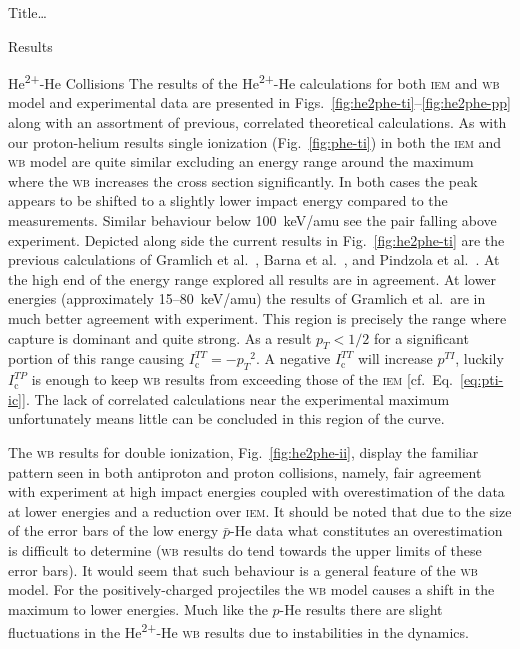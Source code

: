 \documentclass[letterpaper, 10 pt]{report}
\begin{document}
\begin{chapter}{ Title\dots \label{chap:p-he2p-he}}
\begin{section}{Results \label{sec:phe2p-res}}
\begin{subsection}{\texorpdfstring{He\textsuperscript{2+}}{He2+}-He Collisions 
                         \label{sec:he2phe-res}}
         The results of the He\textsuperscript{2+}-He calculations for both \textsc{iem} and \textsc{wb}
         model and experimental data are presented in Figs.~\ref{fig:he2phe-ti}--\ref{fig:he2phe-pp}
         along with an assortment of previous, correlated theoretical calculations. As with our
         proton-helium results single ionization (Fig.~\ref{fig:phe-ti}) in both the \textsc{iem} and
         \textsc{wb} model are quite similar excluding an energy range around the maximum where the
         \textsc{wb} increases the cross section significantly. In both cases the peak appears to be
         shifted to a slightly lower impact energy compared to the measurements. Similar behaviour below
         100~keV/amu see the pair falling above experiment. Depicted along side the current results in
         Fig.~\ref{fig:he2phe-ti} are the previous calculations of Gramlich et al.~\cite{GGS-89}, Barna
         et al.~\cite{BTB-05}, and Pindzola et al.~\cite{PRC-07}. At the high end of the energy range
         explored all results are in agreement. At lower energies (approximately 15--80~keV/amu) the
         results of Gramlich et al.\ are in much better agreement with experiment. This region is
         precisely the range where capture is dominant and quite strong. As a result $p_T < 1/2$ for a
         significant portion of this range causing $I^{TT}_\mathrm{c} = -{p_T}^2$. A negative
         $I^{TT}_\mathrm{c}$ will increase $p^{TI}$, luckily $I^{TP}_\mathrm{c}$ is enough to keep
         \textsc{wb} results from exceeding those of the \textsc{iem}  [cf.\ Eq.~\eqref{eq:pti-ic}]. The
         lack of correlated calculations near the experimental maximum unfortunately means little can be
         concluded in this region of the curve.

         The \textsc{wb} results for double ionization, Fig.~\ref{fig:he2phe-ii}, display the familiar
         pattern seen in both antiproton and proton collisions, namely, fair agreement with experiment
         at high impact energies coupled with overestimation of the data at lower energies and a
         reduction over \textsc{iem}. It should be noted that due to the size of the error bars of the
         low energy $\bar{p}$-He data what constitutes an overestimation is difficult to determine
         (\textsc{wb} results do tend towards the upper limits of these error bars). It would seem that
         such behaviour is a general feature of the \textsc{wb} model. For the positively-charged
         projectiles the \textsc{wb} model causes a shift in the maximum to lower energies. Much like
         the $p$-He results there are slight fluctuations in the He\textsuperscript{2+}-He \textsc{wb}
         results due to instabilities in the dynamics.


\end{subsection}
\end{section}
\end{chapter}
\end{document}
